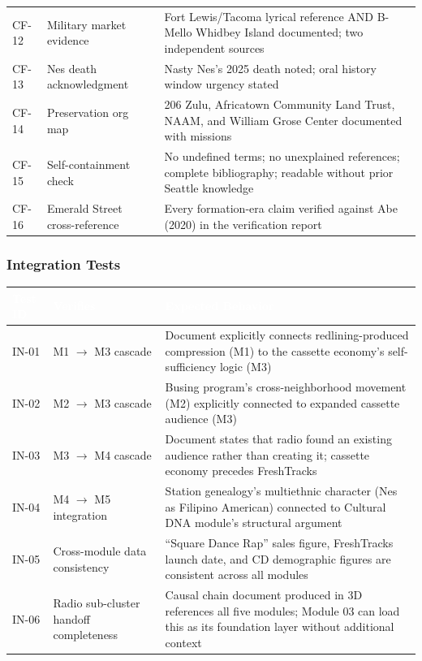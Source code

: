 \documentclass[11pt,letterpaper]{article}
\newcommand{\tableheader}[1]{\textbf{\sffamily\textcolor{white}{#1}}}
\begin{document}
\begin{center}
\begin{tabularx}{\textwidth}{C{1.5cm}L{3cm}X}
CF-12 & Military market evidence & Fort Lewis/Tacoma lyrical reference AND B-Mello Whidbey Island documented; two independent sources \\
CF-13 & Nes death acknowledgment & Nasty Nes's 2025 death noted; oral history window urgency stated \\
CF-14 & Preservation org map & 206 Zulu, Africatown Community Land Trust, NAAM, and William Grose Center documented with missions \\
CF-15 & Self-containment check & No undefined terms; no unexplained references; complete bibliography; readable without prior Seattle knowledge \\
CF-16 & Emerald Street cross-reference & Every formation-era claim verified against Abe (2020) in the verification report \\
\bottomrule
\end{tabularx}
\end{center}

\subsubsection{Integration Tests}

\begin{center}
\begin{tabularx}{\textwidth}{C{1.5cm}L{3.5cm}X}
\toprule
{}
\tableheader{Test ID} & \tableheader{Verifies} & \tableheader{Expected Behavior} \\
\midrule
IN-01 & M1 $\rightarrow$ M3 cascade & Document explicitly connects redlining-produced compression (M1) to the cassette economy's self-sufficiency logic (M3) \\
IN-02 & M2 $\rightarrow$ M3 cascade & Busing program's cross-neighborhood movement (M2) explicitly connected to expanded cassette audience (M3) \\
IN-03 & M3 $\rightarrow$ M4 cascade & Document states that radio found an existing audience rather than creating it; cassette economy precedes FreshTracks \\
IN-04 & M4 $\rightarrow$ M5 integration & Station genealogy's multiethnic character (Nes as Filipino American) connected to Cultural DNA module's structural argument \\
IN-05 & Cross-module data consistency & ``Square Dance Rap'' sales figure, FreshTracks launch date, and CD demographic figures are consistent across all modules \\
IN-06 & Radio sub-cluster handoff completeness & Causal chain document produced in 3D references all five modules; Module 03 can load this as its foundation layer without additional context \\
\bottomrule
\end{tabularx}
\end{center}
\end{document}
